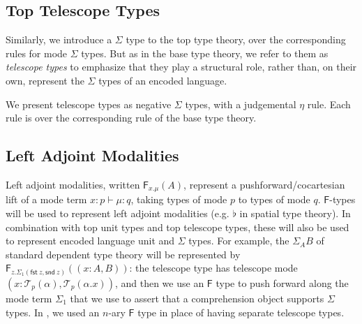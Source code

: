 \documentclass[10pt]{article}
\theoremstyle{definition}
\newcommand\dsd[1]{\ensuremath{\mathsf{#1}}}
\newcommand{\yields}{\vdash}
\newcommand{\TYPE}{\,\,\mathsf{Type}}
\newcommand{\ISFIB}{\,\,\mathsf{IsFib}}
\newcommand{\app}[2]{\ensuremath{#1 \: #2}}
\newcommand{\telety}[3]{\ensuremath{(#1{:}#2,#3)}}
\newcommand{\sigmacl}[3]{\ensuremath{(#1{:}#2,#3)}}
\newcommand{\fst}[1]{\app{\dsd{fst}}{#1}}
\newcommand{\snd}[1]{\app{\dsd{snd}}{#1}}
\newcommand\F[2]{\ensuremath{\mathsf{F}_{#1}(#2)}}
\newcommand\El[2]{\mathcal{T}_{#1}(#2)}
\begin{document}
\subsection{Top Telescope Types}

Similarly, we introduce a $\Sigma$ type to the top type theory, over the
corresponding rules for mode $\Sigma$ types.  But as in the base type
theory, we refer to them as \emph{telescope types} to emphasize that
they play a structural role, rather than, on their own, represent the
$\Sigma$ types of an encoded language.  


We present telescope types as negative $\Sigma$ types, with a
judgemental $\eta$ rule.  Each rule is over the corresponding rule of
the base type theory.

\subsection{Left Adjoint Modalities}

Left adjoint modalities, written $\F{x.\mu}{A}$, represent a
pushforward/cocartesian lift of a mode term $x : p \vdash \mu : q$, taking
types of mode $p$ to types of mode $q$.  $\mathsf{F}$-types will be used
to represent left adjoint modalities (e.g. $\flat$ in spatial type
theory).  In combination with top unit types and top telescope types,
these will also be used to represent encoded language unit and $\Sigma$
types.  For example, the $\Sigma_A B$ of standard dependent type theory
will be represented by $\F{z.\Sigma_1(\fst z, \snd
  z)}{\telety{x}{A}{B}}$: the telescope type has telescope mode
$\sigmacl{x}{\El{p}{\alpha}}{\El{p}{\alpha.x}}$, and then we use an
$\mathsf{F}$ type to push forward along the mode term $\Sigma_1$ that we
use to assert that a comprehension object supports $\Sigma$ types.
In , we used an $n$-ary $\mathsf{F}$ type in
place of having separate telescope types.
\end{document}
